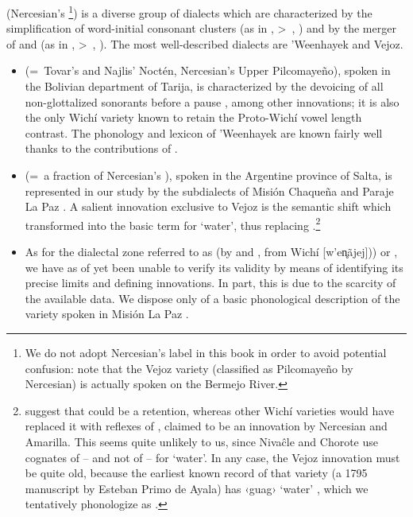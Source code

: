  (Nercesian’s \footnote{We do not adopt Nercesian’s label in this book in order to avoid potential confusion: note that the Vejoz variety (classified as Pilcomayeño by Nercesian) is actually spoken on the Bermejo River.}) is a diverse group of dialects which are characterized by the simplification of word-initial consonant clusters (as in ,  >~, ) and by the merger of  and  (as in ,  >~, ). The most well-described dialects are ’Weenhayek and Vejoz.

\begin{itemize}
    \item {} (=~Tovar’s and Najlis’ Noctén, Nercesian’s Upper Pilcomayeño), spoken in the Bolivian department of Tarija, is characterized by the devoicing of all non-glottalized sonorants before a pause \citep[33–35]{KC94}, among other innovations; it is also the only Wichí variety known to retain the Proto-Wichí vowel length contrast. The phonology and lexicon of ’Weenhayek are known fairly well thanks to the contributions of \citet{KC94,KC16}.
    \item {} (=~a fraction of Nercesian’s ), spoken in the Argentine province of Salta, is represented in our study by the subdialects of Misión Chaqueña \citep{VU74,MG-MELO15} and Paraje La Paz \citep{AFG067}. A salient innovation exclusive to Vejoz is the semantic shift which transformed  into the basic term for ‘water’, thus replacing .\footnote{\citet[280--282]{VN-MA-21} suggest that  could be a retention, whereas other Wichí varieties would have replaced it with reflexes of , claimed to be an innovation by Nercesian and Amarilla. This seems quite unlikely to us, since Nivaĉle and Chorote use cognates of  -- and not of  -- for `water'. In any case, the Vejoz innovation must be quite old, because the earliest known record of that variety (a 1795 manuscript by Esteban Primo de Ayala) has ‹guag› `water' \citep[507]{IC-RM-20}, which we tentatively phonologize as .}
    \item As for the dialectal zone referred to as  (by  and , from Wichí  [w’en̥ãjej])) or  \citep{VN14}, we have as of yet been unable to verify its validity by means of identifying its precise limits and defining innovations. In part, this is due to the scarcity of the available data. We dispose only of a basic phonological description of the variety spoken in Misión La Paz \citep{MA08}.

\end{itemize}
